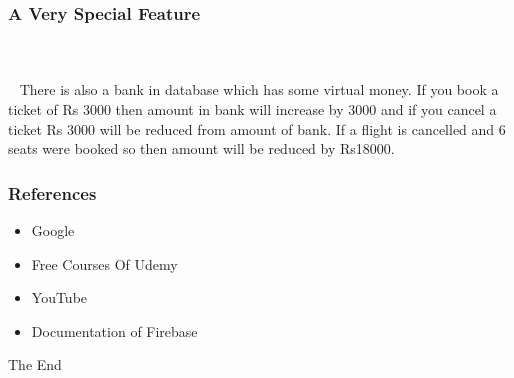\documentclass[8pt]{beamer}
\begin{document}
\begin{frame}
\frametitle{A Very Special Feature}
\\~\\~
There is also a bank in database which has some virtual money. If you book a ticket of Rs 3000 then
amount in bank will increase by 3000 and if you cancel a ticket Rs 3000 will be reduced from amount of
bank. If a flight is cancelled and 6 seats were booked so then amount will be reduced by Rs18000.
\end{frame}


\begin{frame}[fragile] %
\frametitle{References}
\begin{itemize}
\item Google
\item Free Courses Of Udemy
\item YouTube
\item Documentation of Firebase
\end{itemize}

\end{frame}


\begin{frame}
\Huge{\centerline{The End}}
\end{frame}

\end{document}
